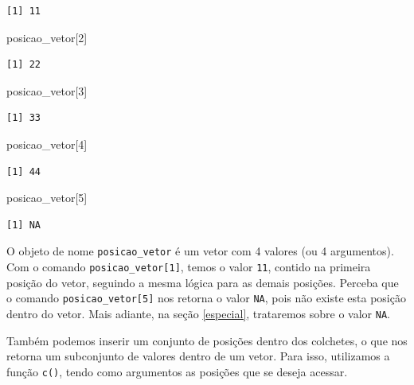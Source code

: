 \documentclass[
  brazilian,
]{book}
\newenvironment{Shaded}{\begin{snugshade}}{\end{snugshade}}
\newcommand{\DecValTok}[1]{\textcolor[rgb]{0.00,0.00,0.81}{#1}}
\newcommand{\NormalTok}[1]{#1}
\begin{document}
\begin{verbatim}
[1] 11
\end{verbatim}

\begin{Shaded}
\begin{Highlighting}[]
\NormalTok{posicao\_vetor[}\DecValTok{2}\NormalTok{]}
\end{Highlighting}
\end{Shaded}

\begin{verbatim}
[1] 22
\end{verbatim}

\begin{Shaded}
\begin{Highlighting}[]
\NormalTok{posicao\_vetor[}\DecValTok{3}\NormalTok{]}
\end{Highlighting}
\end{Shaded}

\begin{verbatim}
[1] 33
\end{verbatim}

\begin{Shaded}
\begin{Highlighting}[]
\NormalTok{posicao\_vetor[}\DecValTok{4}\NormalTok{]}
\end{Highlighting}
\end{Shaded}

\begin{verbatim}
[1] 44
\end{verbatim}

\begin{Shaded}
\begin{Highlighting}[]
\NormalTok{posicao\_vetor[}\DecValTok{5}\NormalTok{]}
\end{Highlighting}
\end{Shaded}

\begin{verbatim}
[1] NA
\end{verbatim}

O objeto de nome \texttt{posicao\_vetor} é um vetor com 4 valores (ou 4 argumentos). Com o comando \texttt{posicao\_vetor{[}1{]}}, temos o valor \texttt{11}, contido na primeira posição do vetor, seguindo a mesma lógica para as demais posições. Perceba que o comando \texttt{posicao\_vetor{[}5{]}} nos retorna o valor \texttt{NA}, pois não existe esta posição dentro do vetor. Mais adiante, na seção \ref{especial}, trataremos sobre o valor \texttt{NA}.

Também podemos inserir um conjunto de posições dentro dos colchetes, o que nos retorna um subconjunto de valores dentro de um vetor. Para isso, utilizamos a função \texttt{c()}, tendo como argumentos as posições que se deseja acessar.
\end{document}
